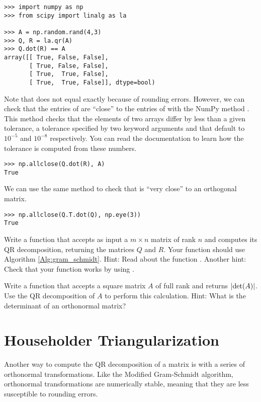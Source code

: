 \begin{lstlisting}
>>> import numpy as np
>>> from scipy import linalg as la

>>> A = np.random.rand(4,3)
>>> Q, R = la.qr(A)
>>> Q.dot(R) == A                      
array([[ True, False, False],
       [ True, False, False],
       [ True,  True, False],
       [ True,  True, False]], dtype=bool)
\end{lstlisting}
 Note that  does not equal  exactly because of rounding errors. 
 However, we can check that the entries of  are ``close'' to the entries of  with the NumPy method . 
 This method checks that the elements of two arrays differ by less than a given tolerance, a tolerance specified by two keyword arguments  and  that default to $10^{-5}$ and $10^{-8}$ respectively. 
 You can read the documentation to learn how the tolerance is computed from these numbers.
\begin{lstlisting}
>>> np.allclose(Q.dot(R), A) 
True
\end{lstlisting}
We can use the same method to check that  is ``very close'' to an orthogonal matrix.
\begin{lstlisting}
>>> np.allclose(Q.T.dot(Q), np.eye(3)) 
True
\end{lstlisting}


\begin{problem}
\label{prob:QR}
Write a function that accepts as input a $m \times n$ matrix of rank $n$ and computes its QR decomposition, returning the matrices $Q$ and $R$. 
Your function should use Algorithm \ref{Alg:gram_schmidt}. 
Hint: Read about the function .
Another hint: Check that your function works by using .
\end{problem}

\begin{problem}
Write a function that accepts a square matrix $A$ of full rank and returns $\left\lvert\det(A)\right\rvert$. 
Use the QR decomposition of $A$ to perform this calculation.
Hint: What is the determinant of an orthonormal matrix?
\end{problem}

\section*{Householder Triangularization}
Another way to compute the QR decomposition of a matrix is with a series of orthonormal transformations. 
Like the Modified Gram-Schmidt algorithm, orthonormal transformations are numerically stable, meaning that they are less susceptible to rounding errors.

